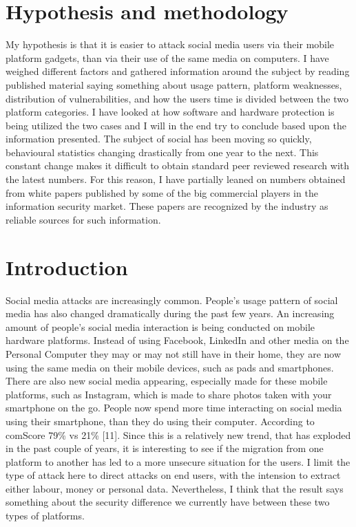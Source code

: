 \section{Hypothesis and methodology}
My hypothesis is that it is easier to attack social media users via their mobile platform gadgets, than via their use of the same media on computers. I have weighed different factors and gathered information around the subject by reading published material saying something about usage pattern, platform weaknesses, distribution of vulnerabilities, and how the users time is divided between the two platform categories. I have looked at how software and hardware protection is being utilized the two cases and I will in the end try to conclude based upon the information presented.
 The subject of social has been moving so quickly, behavioural statistics changing drastically from one year to the next. This constant change makes it difficult to obtain standard peer reviewed research with the latest numbers. For this reason, I have partially leaned on numbers obtained from white papers published by some of the big commercial players in the information security market. These papers are recognized by the industry as reliable sources for such information.
\section{Introduction}
Social media attacks are increasingly common. People’s usage pattern of social media has also changed dramatically during the past few years. An increasing amount of people’s social media interaction is being conducted on mobile hardware platforms. Instead of using Facebook, LinkedIn and other media on the Personal Computer they may or may not still have in their home, they are now using the same media on their mobile devices, such as pads and smartphones. There are also new social media appearing, especially made for these mobile platforms, such as Instagram, which is made to share photos taken with your smartphone on the go.
People now spend more time interacting on social media using their smartphone, than they do using their computer. According to comScore 79\% vs 21\% [11]. Since this is a relatively new trend, that has exploded in the past couple of years, it is interesting to see if the migration from one platform to another has led to a more unsecure situation for the users. I limit the type of attack here to direct attacks on end users, with the intension to extract either labour, money or personal data. Nevertheless, I think that the result says something about the security difference we currently have between these two types of platforms.
